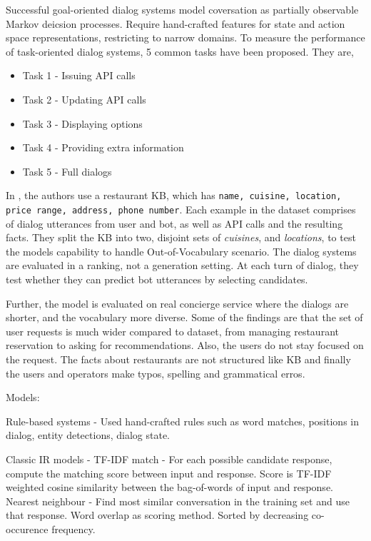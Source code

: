 \documentclass[11pt,a4paper]{article}
\begin{document}
Successful goal-oriented dialog systems model coversation as partially observable Markov deicsion processes. Require hand-crafted features for state and action space representations, restricting to narrow domains. To measure the performance of task-oriented dialog systems, 5 common tasks have been proposed. They are,

\begin{itemize}[leftmargin=*,label={}]
  \setlength\itemsep{0em}
  \item Task 1 - Issuing API calls
  \item Task 2 - Updating API calls
  \item Task 3 - Displaying options
  \item Task 4 - Providing extra information
  \item Task 5 - Full dialogs
\end{itemize}

In \cite{Bordes2016LearningEG}, the authors use a restaurant KB, which has \texttt{name, cuisine, location, price range, address, phone number}. Each example in the dataset comprises of dialog utterances from user and bot, as well as API calls and the resulting facts. They split the KB into two, disjoint sets of \textit{cuisines}, and \textit{locations}, to test the models capability to handle Out-of-Vocabulary scenario. The dialog systems are evaluated in a ranking, not a generation setting. At each turn of dialog, they test whether they can predict bot utterances by selecting candidates.

Further, the model is evaluated on real concierge service where the dialogs are shorter, and the vocabulary more diverse. Some of the findings are that the set of user requests is much wider compared to dataset, from managing restaurant reservation to asking for recommendations. Also, the users do not stay focused on the request. The facts about restaurants are not structured like KB and finally the users and operators make typos, spelling and grammatical erros.

Models:

Rule-based systems - Used hand-crafted rules such as word matches, positions in dialog, entity detections, dialog state.

Classic IR models - 
  TF-IDF match - For each possible candidate response, compute the matching score between input and response. Score is TF-IDF weighted cosine similarity between the bag-of-words of input and response.
  Nearest neighbour - Find most similar conversation in the training set and use that response. Word overlap as scoring method. Sorted by decreasing co-occurence frequency.
\end{document}
